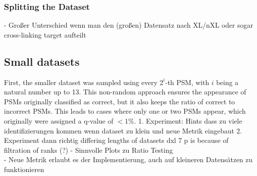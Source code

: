\subsubsection{Splitting the Dataset}
\label{lab:results:splitting}
- Großer Unterschied wenn man den (großen) Datensatz nach XL/nXL oder sogar cross-linking target aufteilt\\

\subsection{Small datasets}
First, the smaller dataset was sampled using every $2^i$-th PSM, with $i$ being a natural number up to 13. This non-random approach ensures the appearance of PSMs originally classified as correct, but it also keeps the ratio of correct to incorrect PSMs. This leads to cases where only one or two PSMs appear, which originally were assigned a q-value of $<1\%$. 
1. Experiment: Hints dass zu viele identifizierungen kommen wenn dataset zu klein und neue Metrik eingebaut
2. Experiment dann richtig
differing lengths of datasets dxl 7 p is because of filtration of ranks (?)
- Sinnvolle Plots zu Ratio Testing\\
- Neue Metrik erlaubt es der Implementierung, auch auf kleineren Datensätzen zu funktionieren